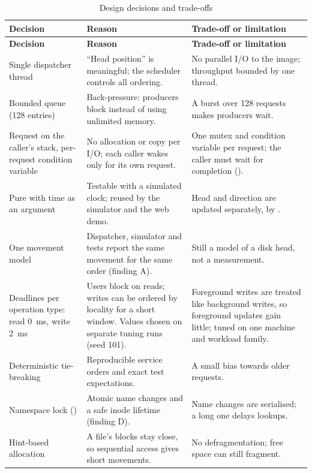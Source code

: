 \documentclass[12pt,a4paper]{article}
\DeclareRobustCommand{\code}[1]{\texttt{\detokenize{#1}}}
\begin{document}
{\small
\begin{longtable}{@{}>{\raggedright\arraybackslash}p{3.4cm}>{\raggedright\arraybackslash}p{5.6cm}>{\raggedright\arraybackslash}p{5.6cm}@{}}
\caption{Design decisions and trade-offs}\label{tab:decisions}\\
\toprule
\textbf{Decision} & \textbf{Reason} & \textbf{Trade-off or limitation} \\
\midrule
\endfirsthead
\toprule
\textbf{Decision} & \textbf{Reason} & \textbf{Trade-off or limitation} \\
\midrule
\endhead
\bottomrule
\endfoot
Single dispatcher thread & ``Head position'' is meaningful; the scheduler controls all ordering. & No parallel I/O to the image; throughput bounded by one thread. \\
Bounded queue (128 entries) & Back-pressure: producers block instead of using unlimited memory. & A burst over 128 requests makes producers wait. \\
Request on the caller's stack, per-request condition variable & No allocation or copy per I/O; each caller wakes only for its own request. & One mutex and condition variable per request; the caller must wait for completion (\code{request_wait}). \\
Pure \code{scheduler_pick()} with time as an argument & Testable with a simulated clock; reused by the simulator and the web demo. & Head and direction are updated separately, by \code{scheduler_advance()}. \\
One movement model & Dispatcher, simulator and tests report the same movement for the same order (finding A). & Still a model of a disk head, not a measurement. \\
Deadlines per operation type: read 0~ms, write 2~ms & Users block on reads; writes can be ordered by locality for a short window. Values chosen on separate tuning runs (seed 101). & Foreground writes are treated like background writes, so foreground updates gain little; tuned on one machine and workload family. \\
Deterministic tie-breaking & Reproducible service orders and exact test expectations. & A small bias towards older requests. \\
Namespace lock (\code{ns_lock}) & Atomic name changes and a safe inode lifetime (finding D). & Name changes are serialised; a long one delays lookups. \\
Hint-based allocation & A file's blocks stay close, so sequential access gives short movements. & No defragmentation; free space can still fragment. \\

\end{longtable}}
\end{document}
